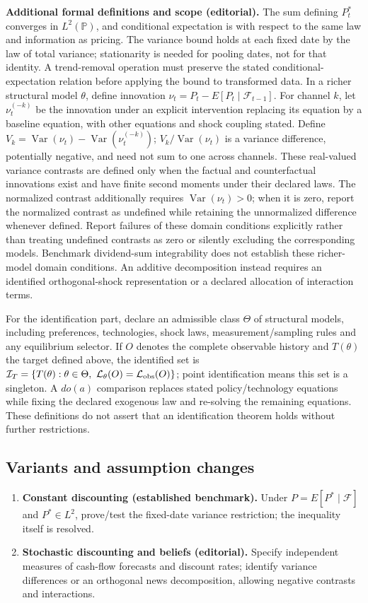 \documentclass[11pt,a4paper]{article}
\begin{document}
\textbf{Additional formal definitions and scope (editorial).} The sum defining \(P_t^*\) converges in \(L^2(\mathbb P)\), and conditional expectation is with respect to the same law and information as pricing. The variance bound holds at each fixed date by the law of total variance; stationarity is needed for pooling dates, not for that identity. A trend-removal operation must preserve the stated conditional-expectation relation before applying the bound to transformed data. In a richer structural model \(\theta\), define innovation \(\nu_t=P_t-E[P_t\mid\mathcal F_{t-1}]\). For channel \(k\), let \(\nu_t^{(-k)}\) be the innovation under an explicit intervention replacing its equation by a baseline equation, with other equations and shock coupling stated. Define \(V_k=\operatorname{Var}(\nu_t)-\operatorname{Var}(\nu_t^{(-k)})\); \(V_k/\operatorname{Var}(\nu_t)\) is a variance difference, potentially negative, and need not sum to one across channels. These real-valued variance contrasts are defined only when the factual and counterfactual innovations exist and have finite second moments under their declared laws. The normalized contrast additionally requires \(\operatorname{Var}(\nu_t)>0\); when it is zero, report the normalized contrast as undefined while retaining the unnormalized difference whenever defined. Report failures of these domain conditions explicitly rather than treating undefined contrasts as zero or silently excluding the corresponding models. Benchmark dividend-sum integrability does not establish these richer-model domain conditions. An additive decomposition instead requires an identified orthogonal-shock representation or a declared allocation of interaction terms.

For the identification part, declare an admissible class \(\Theta\) of structural models, including preferences, technologies, shock laws, measurement/sampling rules and any equilibrium selector. If \(O\) denotes the complete observable history and \(T(\theta)\) the target defined above, the identified set is \(\mathcal I_T=\{T(\theta):\theta\in\Theta,\ \mathcal L_\theta(O)=\mathcal L_{\rm obs}(O)\}\); point identification means this set is a singleton. A \(do(a)\) comparison replaces stated policy/technology equations while fixing the declared exogenous law and re-solving the remaining equations. These definitions do not assert that an identification theorem holds without further restrictions.
\subsection*{Variants and assumption changes}
\begin{enumerate}
\item \textbf{Constant discounting (established benchmark).} Under \(P=E[P^*\mid\mathcal F]\) and \(P^*\in L^2\), prove/test the fixed-date variance restriction; the inequality itself is resolved.
\item \textbf{Stochastic discounting and beliefs (editorial).} Specify independent measures of cash-flow forecasts and discount rates; identify variance differences or an orthogonal news decomposition, allowing negative contrasts and interactions.
\end{enumerate}
\end{document}
